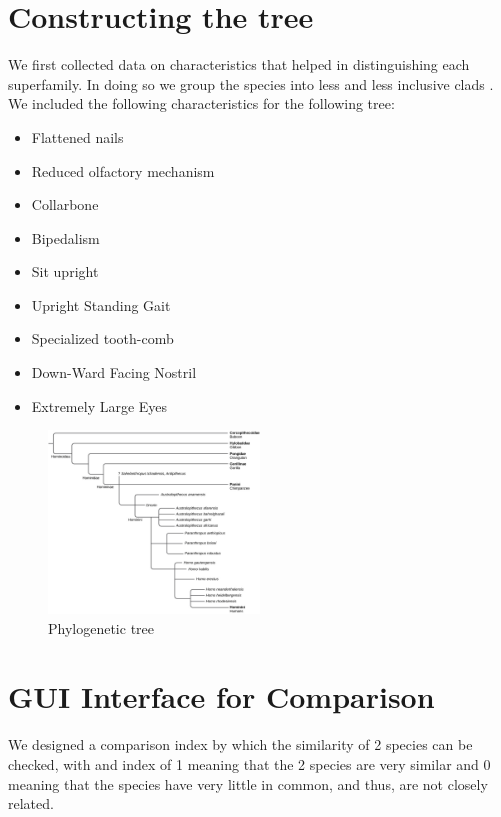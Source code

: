 \documentclass[a4paper,20pt,titlepage]{article}
\begin{document}
\section{Constructing the tree}
We first collected data on characteristics \cite{NHC} that helped in distinguishing each superfamily.
In doing so we group the species into less and less inclusive clads \cite{Berkeley}.
We included the following characteristics for the following tree:

\begin{itemize}
  \item Flattened nails
  \item Reduced olfactory mechanism
  \item Collarbone
  \item Bipedalism
  \item Sit upright
  \item Upright Standing Gait
  \item Specialized tooth-comb
  \item Down-Ward Facing Nostril
  \item Extremely Large Eyes
\end{itemize}

\begin{figure}[htbp]
    \centering
    \includegraphics[width=0.5\textwidth]{primates.jpg}
    \caption{Phylogenetic tree}
    \label{fig:example}
\end{figure}


\section{GUI Interface for Comparison}

We designed a comparison index by which the similarity of 2 species can be checked, with and index of 1 meaning that the 2 species are very similar and 0 meaning that the species have very little in common, and thus, are not closely related.
\end{document}
